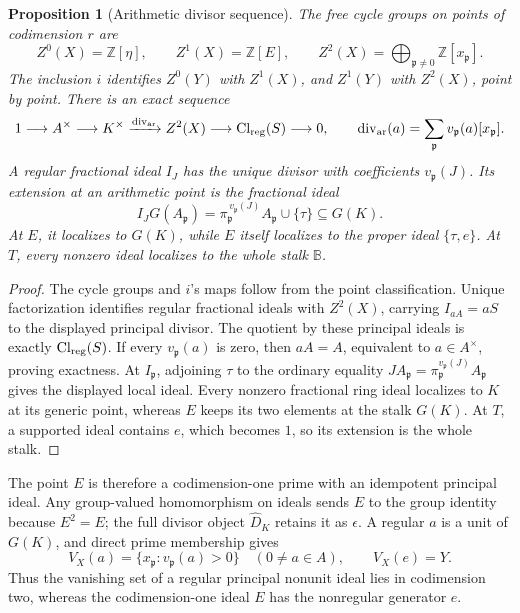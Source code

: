 \documentclass[11pt,a4paper]{article}
\newtheorem{proposition}[theorem]{Proposition}
\theoremstyle{definition}\newtheorem{definition}[theorem]{Definition}
\begin{document}
\begin{proposition}[Arithmetic divisor sequence]\label{prop:sz-divisor-sequence}
The free cycle groups on points of codimension \(r\) are
\[
 Z^0(X)=\mathbb Z[\eta],\qquad Z^1(X)=\mathbb Z[E],\qquad
 Z^2(X)=\bigoplus_{\mathfrak p\ne0}\mathbb Z[x_{\mathfrak p}].
\]
The inclusion \(i\) identifies \(Z^0(Y)\) with \(Z^1(X)\), and
\(Z^1(Y)\) with \(Z^2(X)\), point by point.
There is an exact sequence
\begin{equation}\label{eq:sz-divisor-sequence}
 1\longrightarrow A^\times\longrightarrow K^\times
 \xrightarrow{\operatorname{div}_{\rm ar}}Z^2(X)
 \longrightarrow\mathrm{Cl}_{\rm reg}(S)\longrightarrow0,\qquad
 \operatorname{div}_{\rm ar}(a)=
 \sum_{\mathfrak p}v_{\mathfrak p}(a)[x_{\mathfrak p}].
\end{equation}
A regular fractional ideal \(I_J\) has the unique divisor with
coefficients \(v_{\mathfrak p}(J)\).
Its extension at an arithmetic point is the fractional ideal
\[
 I_JG(A_{\mathfrak p})
 =\pi_{\mathfrak p}^{\,v_{\mathfrak p}(J)}A_{\mathfrak p}
   \cup\{\tau\}\subseteq G(K).
\]
At \(E\), it localizes to \(G(K)\), while \(E\) itself localizes to
the proper ideal \(\{\tau,e\}\). At \(T\), every nonzero ideal
localizes to the whole stalk \(\mathbb B\).
\end{proposition}
\begin{proof}
The cycle groups and \(i\)'s maps follow from the point classification.
Unique factorization identifies regular fractional ideals with
\(Z^2(X)\), carrying \(I_{aA}=aS\) to the displayed principal divisor.
The quotient by these principal ideals is exactly
\(\mathrm{Cl}_{\rm reg}(S)\). If every \(v_{\mathfrak p}(a)\) is zero,
then \(aA=A\), equivalent to \(a\in A^\times\), proving exactness.
At \(I_{\mathfrak p}\), adjoining \(\tau\) to the ordinary equality
\(JA_{\mathfrak p}=\pi_{\mathfrak p}^{v_{\mathfrak p}(J)}A_{\mathfrak p}\)
gives the displayed local ideal.
Every nonzero fractional ring ideal localizes to \(K\) at its
generic point, whereas \(E\) keeps its two elements at the stalk
\(G(K)\). At \(T\), a supported ideal contains \(e\), which becomes
\(1\), so its extension is the whole stalk.
\end{proof}

The point \(E\) is therefore a codimension-one prime with an
idempotent principal ideal. Any group-valued homomorphism on ideals
sends \(E\) to the group identity because \(E^2=E\); the full divisor
object \(\widehat D_K\) retains it as \(\epsilon\).
A regular \(a\) is a unit of \(G(K)\), and direct prime membership gives
\[
 V_X(a)=\{x_{\mathfrak p}:v_{\mathfrak p}(a)>0\}\quad(0\ne a\in A),
 \qquad V_X(e)=Y .
\]
Thus the vanishing set of a regular principal nonunit ideal lies
in codimension two, whereas the codimension-one ideal \(E\) has
the nonregular generator \(e\).
\end{document}
